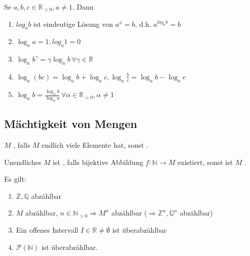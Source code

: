 \begin{proposition}\label{proposition_logarithmus_r}
	Se $a,b,c\in\mathbb{R}_{>0}, a\neq 1$. Dann
	\begin{enumerate}[label={\arabic*)}]
		\item $log_a b$ ist eindeutige Lösung von $a^x = b$, d.h. $a^{log_a b} = b$
		\item $\log_a a = 1, log_a 1 = 0$
		\item $\log_a b^\gamma = \gamma \log_a b \,\forall \gamma\in\mathbb{R}$
		\item $\log_a(bc) = \log_a b + \log_a c, \log_a \frac{b}{c} = \log_a b - \log_a c$
		\item $\log_a b = \frac{\log_\alpha b}{\log_\alpha a}\,\forall \alpha\in\mathbb{R}_{>0},\alpha\neq 1$
	\end{enumerate}
\end{proposition}

\subsection{Mächtigkeit von Mengen}

\begin{*definition}
	$M$ , falls $M$ endlich viele Elemente hat, sonst .
	
	Unendliches $M$ ist , falls bijektive Abbildung $f:\mathbb{N}\to M$ existiert, sonst ist $M$ .
\end{*definition}

\begin{proposition}
	Es gilt:
	\begin{enumerate}[label={\arabic*)}]
		\item $\mathbb{Z},\mathbb{Q}$ abzählbar
		\item $M$ abzählbar, $n\in\mathbb{N}_{>0} \Rightarrow M^n$ abzählbar ($\Rightarrow \mathbb{Z}^n, \mathbb{Q}^n$ abzählbar)
		\item Ein offenes Intervall $I\in\mathbb{R}\neq \emptyset $ ist überabzählbar
		\item $\mathcal{P}(\mathbb{N})$ ist überabzählbar.
	\end{enumerate}
\end{proposition}